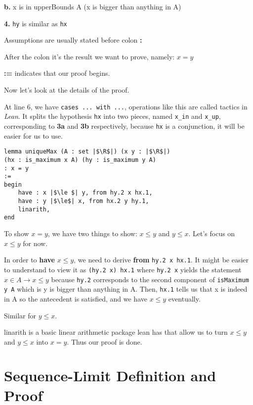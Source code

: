 \documentclass[a4paper]{article}
\newcommand{\R}{\mathbb{R}}
\begin{document}
\quad\textbf{b.} x is in upperBounds A (x is bigger than anything in A)

\textbf{4. }\texttt{hy} is similar as \texttt{hx} 

Assumptions are usually stated before colon \textbf{:}

After the colon it's the result we want to prove, namely: $x = y$

\textbf{:=} indicates that  our proof begins.

Now let's look at the details of the proof.

At line 6, we have \texttt{cases ... with ...}, operations like this are called tactics in \textit{Lean}. It splits the hypothesis \texttt{hx} into two pieces, named \texttt{x\_in} and \texttt{x\_up}, corresponding to \textbf{3a} and \textbf{3b} respectively, because \texttt{hx} is a conjunction, it will be easier for us to use.


\bigskip
\begin{listing}[!ht]
\begin{verbatim}
lemma uniqueMax (A : set |$\R$|) (x y : |$\R$|) 
(hx : is_maximum x A) (hy : is_maximum y A) 
: x = y 
:= 
begin
	have : x |$\le $| y, from hy.2 x hx.1,
	have : y |$\le$| x, from hx.2 y hy.1,
	linarith,
end
\end{verbatim}
	
\end{listing}


To show $x = y$, we have two things to show:  $x \le y$ and $y \le x$. Let's focus on $x \le y$ for now.

In order to \textbf{have} $x \le y$, we need to derive \textbf{from} \texttt{hy.2 x hx.1}. It might be easier to understand to view it as \texttt{(hy.2 x) hx.1} where \texttt{hy.2 x} yields the statement $x \in A \to  x\le y$ because \texttt{hy.2} corresponds to the second component of \texttt{isMaximum y A} which is y is bigger than anything in A. Then, \texttt{hx.1} tells us that x is indeed in A so the antecedent is satisfied, and we have $ x \le y$ eventually.

Similar for $y \le x$.

linarith is a basic linear arithmetic package lean has that allow us to turn $ x \le y$ and $y \le x$ into $x =y$. Thus our proof is done.

\section{Sequence-Limit Definition and Proof}
\end{document}
